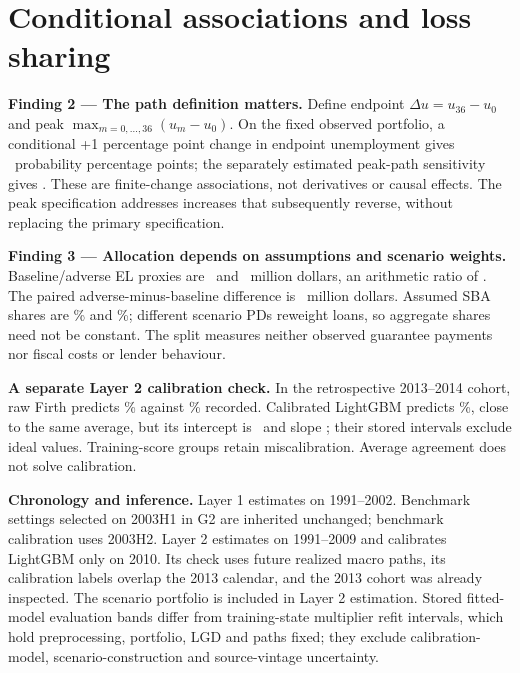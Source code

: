 \section*{Conditional associations and loss sharing}
\textbf{Finding 2 — The path definition matters.} Define endpoint $\Delta u=u_{36}-u_0$ and peak $\max_{m=0,\ldots,36}(u_m-u_0)$. On the fixed observed portfolio, a conditional +1 percentage point change in endpoint unemployment gives \Endpoint\ probability percentage points; the separately estimated peak-path sensitivity gives \Peak. These are finite-change associations, not derivatives or causal effects. The peak specification addresses increases that subsequently reverse, without replacing the primary specification.

\textbf{Finding 3 — Allocation depends on assumptions and scenario weights.} Baseline/adverse EL proxies are \ElBase\ and \ElAdverse\ million dollars, an arithmetic ratio of \ElRatio. The paired adverse-minus-baseline difference is \ElDiff\ million dollars. Assumed SBA shares are \ShareBase\% and \ShareAdverse\%; different scenario PDs reweight loans, so aggregate shares need not be constant. The split measures neither observed guarantee payments nor fiscal costs or lender behaviour. \scenario

\textbf{A separate Layer 2 calibration check.} In the retrospective 2013--2014 cohort, raw Firth predicts \LtwoFirth\% against \LtwoRate\% recorded. Calibrated LightGBM predicts \LtwoTree\%, close to the same average, but its intercept is \TreeIntercept\ and slope \TreeSlope; their stored intervals exclude ideal values. Training-score groups retain miscalibration. Average agreement does not solve calibration.

\textbf{Chronology and inference.} Layer 1 estimates on 1991--2002. Benchmark settings selected on 2003H1 in G2 are inherited unchanged; benchmark calibration uses 2003H2. Layer 2 estimates on 1991--2009 and calibrates LightGBM only on 2010. Its check uses future realized macro paths, its calibration labels overlap the 2013 calendar, and the 2013 cohort was already inspected. The scenario portfolio is included in Layer 2 estimation. Stored fitted-model evaluation bands differ from training-state multiplier refit intervals, which hold preprocessing, portfolio, LGD and paths fixed; they exclude calibration-model, scenario-construction and source-vintage uncertainty.

